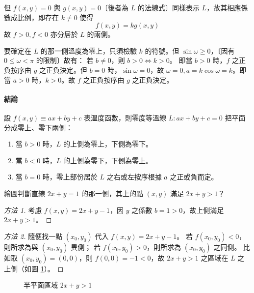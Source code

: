 但 $f(x, y) = 0$ 與 $g(x, y) = 0$〔後者為 $L$ 的法線式〕同樣表示 $L$，故其相應係數成比例，即存在 $k \neq 0$ 使得
\[ f(x, y) = k g(x, y) \]
故 $f > 0, f < 0$ 亦分居於 $L$ 的兩側。

要確定在 $L$ 的那一側溫度為零上，只須檢驗 $k$ 的符號。但 $\sin\omega \ge 0$，〔因有 $0 \le \omega < \pi$ 的限制〕故有：
若 $b \neq 0$，則 $b > 0 \iff k > 0$。
即當 $b > 0$ 時，$f$ 之正負按序由 $g$ 之正負決定。但 $b = 0$ 時，$\sin\omega = 0$，故 $\omega = 0, a = k\cos\omega = k$。即當 $a > 0$ 時，$k > 0$。故 $f$ 之正負按序由 $g$ 之正負決定。

\paragraph*{結論} 設 $f(x, y) \equiv ax + by + c$ 表溫度函數，則零度等溫線 $L : ax + by + c = 0$ 把平面分成零上、零下兩側：
\begin{enumerate}[label=(\roman*), leftmargin=2em]
  \item 當 $b > 0$ 時，$L$ 的上側為零上，下側為零下。
  \item 當 $b < 0$ 時，$L$ 的上側為零下，下側為零上。
  \item 當 $b = 0$ 時，零上部份居於 $L$ 之右或左按序根據 $a$ 之正或負而定。
\end{enumerate}

\begin{example}[論例 4]
繪圖判斷直線 $2x + y = 1$ 的那一側，其上的點 $(x, y)$ 滿足 $2x + y > 1$？
\end{example}

\begin{proof}[方法 1]
考慮 $f(x, y) = 2x + y - 1$，因 $y$ 之係數 $b = 1 > 0$，故上側滿足 $2x + y > 1$。
\end{proof}

\begin{proof}[方法 2]
隨便找一點 $(x_0, y_0)$ 代入 $f(x, y) = 2x + y - 1$。
若 $f(x_0, y_0) < 0$，則所求為與 $(x_0, y_0)$ 異側；
若 $f(x_0, y_0) > 0$，則所求為 $(x_0, y_0)$ 之同側。
比如取 $(x_0, y_0) = (0, 0)$，則 $f(0, 0) = -1 < 0$，故 $2x + y > 1$ 之區域在 $L$ 之上側（如圖 \ref{fig:4-33}）。
\end{proof}

\begin{figure}[H]
\centering
{}
\caption{半平面區域 $2x+y>1$}
\label{fig:4-33}
\end{figure}

